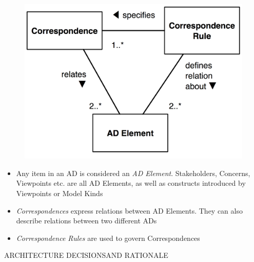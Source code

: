		\begin{frame}
					\begin{figure}
						\begin{center}
							\includegraphics[width=\textwidth]{img/ConceptualModelArchitectureDescriptionElements}
						\end{center}
					\end{figure}
		\end{frame}
		
		\begin{frame}
			\begin{itemize}
				\item Any item in an AD is considered an \emph{AD Element}. Stakeholders, Concerns, Viewpoints etc. are all AD Elements, as well as constructs introduced by Viewpoints or Model Kinds
				\vspace{0.3cm}
				\item \emph{Correspondences} express relations between AD Elements. They can also describe relations between two different ADs
				\vspace{0.3cm}
				\item \emph{Correspondence Rules} are used to govern Correspondences
			\end{itemize}
		\end{frame}
		
			\begin{frame}
		\begin{center}
				\begin{LARGE}
					ARCHITECTURE DECISIONS\newline\newline AND RATIONALE
				\end{LARGE}
			\end{center}
		\end{frame}
		
